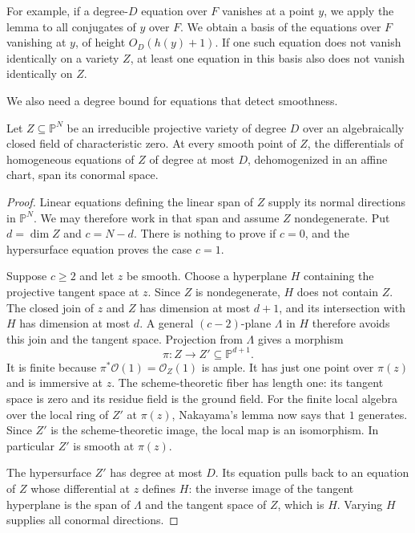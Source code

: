 For example, if a degree-$D$ equation over $F$ vanishes at a point $y$, we
apply the lemma to all conjugates of $y$ over $F$.  We obtain a basis of
the equations over $F$ vanishing at $y$, of height $O_D(h(y)+1)$.
If one such equation does not vanish identically on a variety $Z$, at
least one equation in this basis also does not vanish identically on $Z$.

We also need a degree bound for equations that detect smoothness.

\begin{lemma}\label{lemma:bounded-conormal}
Let $Z\subseteq\mathbb P^N$ be an irreducible projective variety of degree
$D$ over an algebraically closed field of characteristic zero.  At every
smooth point of $Z$, the differentials of homogeneous equations of $Z$
of degree at most $D$, dehomogenized in an affine chart, span its
conormal space.
\end{lemma}

\begin{proof}
Linear equations defining the linear span of $Z$ supply its normal
directions in $\mathbb P^N$.  We may therefore work in that span and
assume $Z$ nondegenerate.  Put $d=\dim Z$ and $c=N-d$.  There is nothing
to prove if $c=0$, and the hypersurface equation proves the case $c=1$.

Suppose $c\geq2$ and let $z$ be smooth.  Choose a hyperplane $H$
containing the projective tangent space at $z$.  Since $Z$ is
nondegenerate, $H$ does not contain $Z$.  The closed join of $z$ and
$Z$ has dimension at most $d+1$, and its intersection with $H$ has
dimension at most $d$.  A general $(c-2)$-plane $\Lambda$ in $H$
therefore avoids this join and the tangent space.  Projection from
$\Lambda$ gives a morphism
\[
 \pi:Z\longrightarrow Z'\subseteq\mathbb P^{d+1}.
\]
It is finite because $\pi^*\mathcal O(1)=\mathcal O_Z(1)$ is ample.
It has just one point over $\pi(z)$ and is immersive at $z$.
The scheme-theoretic fiber has length one: its tangent space is zero
and its residue field is the ground field.  For the finite local algebra
over the local ring of $Z'$ at $\pi(z)$, Nakayama's lemma now says that
$1$ generates.  Since $Z'$ is the scheme-theoretic image, the local
map is an isomorphism.  In particular $Z'$ is smooth at $\pi(z)$.

The hypersurface $Z'$ has degree at most $D$.  Its equation pulls back
to an equation of $Z$ whose differential at $z$ defines $H$: the
inverse image of the tangent hyperplane is the span of $\Lambda$ and
the tangent space of $Z$, which is $H$.  Varying $H$ supplies all
conormal directions.
\end{proof}

